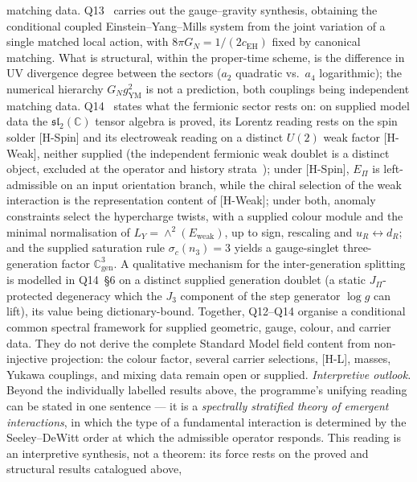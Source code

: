 \documentclass[11pt,a4paper]{article}
\begin{document}
  matching data.
  Q13~\cite{Beau2026q13} carries out the gauge--gravity synthesis, obtaining the conditional
  coupled Einstein--Yang--Mills system from the joint variation of a single matched local action,
  with $8\pi G_N = 1/(2c_{\mathrm{EH}})$ fixed by canonical matching. What is
  structural, within the proper-time scheme, is the difference in UV divergence degree between the
  sectors ($a_2$ quadratic vs.\ $a_4$ logarithmic); the numerical hierarchy
  $G_N g_{\mathrm{YM}}^2$ is not a prediction, both couplings being independent matching data.
  Q14~\cite{Beau2026q14} states what the fermionic sector rests on: on supplied model data the
  $\mathfrak{sl}_2(\mathbb{C})$ tensor algebra is proved, its Lorentz reading rests on the spin solder
  [H-Spin] and its electroweak reading on a distinct $U(2)$ weak factor [H-Weak], neither supplied (the
  independent fermionic weak doublet is a distinct object, excluded at the operator and history
  strata~\cite{Beau2026nsr}); under [H-Spin], $E_\Pi$ is left-admissible on an input orientation branch,
  while the chiral selection of the weak interaction is the representation content of [H-Weak]; under both,
  anomaly constraints select the hypercharge twists, with a supplied colour module and the minimal
  normalisation of $L_Y = \wedge^2(E_{\mathrm{weak}})$, up to sign, rescaling and $u_R \leftrightarrow d_R$;
  and the supplied saturation rule $\sigma_c(n_3) = 3$ yields a gauge-singlet three-generation factor
  $\mathbb{C}^3_{\mathrm{gen}}$.
  A qualitative mechanism for the inter-generation splitting is modelled in Q14~\S6 on a distinct supplied
  generation doublet (a static $J_\Pi$-protected degeneracy which the $J_3$ component of the step generator
  $\log g$ can lift), its value
  being dictionary-bound.
  Together, Q12--Q14 organise a conditional common spectral framework for supplied geometric,
  gauge, colour, and carrier data. They do not derive the complete Standard Model field content
  from non-injective projection: the colour factor, several carrier selections, [H-L], masses,
  Yukawa couplings, and mixing data remain open or supplied.
  \emph{Interpretive outlook.} Beyond the individually labelled results above, the programme's
  unifying reading can be stated in one sentence --- it is a \emph{spectrally stratified theory of
  emergent interactions}, in which the type of a fundamental interaction is determined by the
  Seeley--DeWitt order at which the admissible operator responds. This reading is an interpretive
  synthesis, not a theorem: its force rests on the proved and structural results catalogued above,
\end{document}
